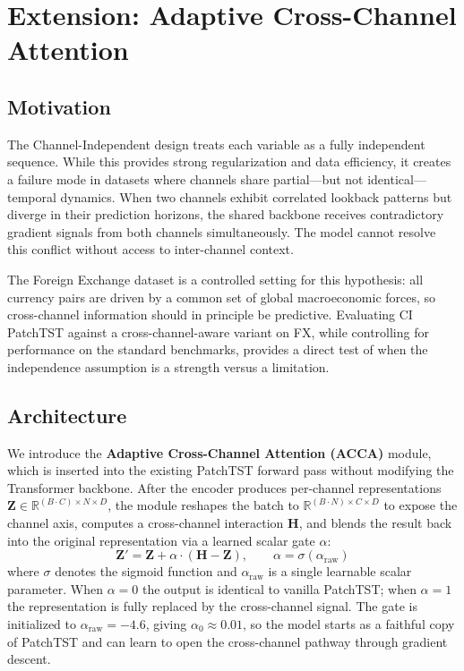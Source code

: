 \documentclass[11pt]{article}
\begin{document}
\section{Extension: Adaptive Cross-Channel Attention}
\label{sec:extension}

\subsection{Motivation}

The Channel-Independent design treats each variable as a fully independent sequence. While this provides strong regularization and data efficiency, it creates a failure mode in datasets where channels share partial—but not identical—temporal dynamics. When two channels exhibit correlated lookback patterns but diverge in their prediction horizons, the shared backbone receives contradictory gradient signals from both channels simultaneously. The model cannot resolve this conflict without access to inter-channel context.

The Foreign Exchange dataset is a controlled setting for this hypothesis: all currency pairs are driven by a common set of global macroeconomic forces, so cross-channel information should in principle be predictive. Evaluating CI PatchTST against a cross-channel-aware variant on FX, while controlling for performance on the standard benchmarks, provides a direct test of when the independence assumption is a strength versus a limitation.

\subsection{Architecture}

We introduce the \textbf{Adaptive Cross-Channel Attention (ACCA)} module, which is inserted into the existing PatchTST forward pass without modifying the Transformer backbone. After the encoder produces per-channel representations $\mathbf{Z} \in \mathbb{R}^{(B \cdot C) \times N \times D}$, the module reshapes the batch to $\mathbb{R}^{(B \cdot N) \times C \times D}$ to expose the channel axis, computes a cross-channel interaction $\mathbf{H}$, and blends the result back into the original representation via a learned scalar gate $\alpha$:
\begin{equation}
    \mathbf{Z}' = \mathbf{Z} + \alpha \cdot (\mathbf{H} - \mathbf{Z}), \qquad \alpha = \sigma(\alpha_{\text{raw}})
\end{equation}
where $\sigma$ denotes the sigmoid function and $\alpha_{\text{raw}}$ is a single learnable scalar parameter. When $\alpha = 0$ the output is identical to vanilla PatchTST; when $\alpha = 1$ the representation is fully replaced by the cross-channel signal. The gate is initialized to $\alpha_{\text{raw}} = -4.6$, giving $\alpha_0 \approx 0.01$, so the model starts as a faithful copy of PatchTST and can learn to open the cross-channel pathway through gradient descent.
\end{document}

